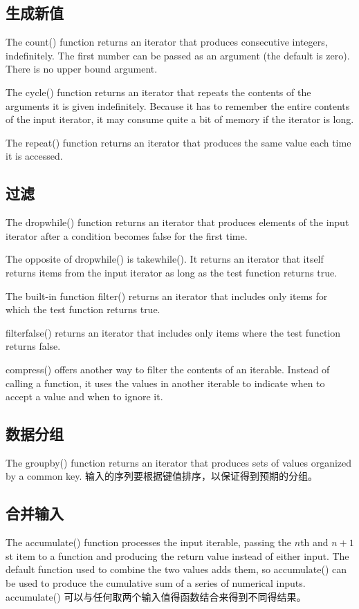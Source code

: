 \subsection{生成新值}
The count() function returns an iterator that produces consecutive integers, indefinitely. The first number can be passed as an argument (the default is zero). There is no upper bound argument.

The cycle() function returns an iterator that repeats the contents of the arguments it is given indefinitely. Because it has to remember the entire contents of the input iterator, it may consume quite a bit of memory if the iterator is long.

The repeat() function returns an iterator that produces the same value each time it is accessed.
\subsection{过滤}
The dropwhile() function returns an iterator that produces elements of the input iterator after a condition becomes false for the first time.

The opposite of dropwhile() is takewhile(). It returns an iterator that itself returns items from the input iterator as long as the test function returns true.

The built-in function filter() returns an iterator that includes only items for which the test function returns true.

filterfalse() returns an iterator that includes only items where the test function returns false.

compress() offers another way to filter the contents of an iterable. Instead of calling a function, it uses the values in another iterable to indicate when to accept a value and when to ignore it.

\subsection{数据分组}
The groupby() function returns an iterator that produces sets of values organized by a common key. 输入的序列要根据键值排序，以保证得到预期的分组。

\subsection{合并输入}
The accumulate() function processes the input iterable, passing the $n$th and $n+1$st item to a function and producing the return value instead of either input. The default function used to combine the two values adds them, so accumulate() can be used to produce the cumulative sum of a series of numerical inputs. accumulate() 可以与任何取两个输入值得函数结合来得到不同得结果。

